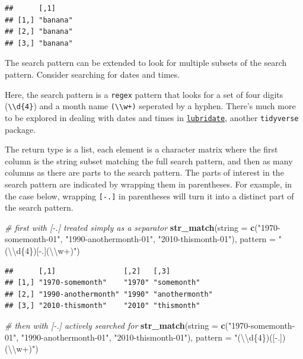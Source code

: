 \documentclass[]{book}
\newenvironment{Shaded}{}{}
\newcommand{\CharTok}[1]{\textcolor[rgb]{0.25,0.44,0.63}{#1}}
\newcommand{\CommentTok}[1]{\textcolor[rgb]{0.38,0.63,0.69}{\textit{#1}}}
\newcommand{\DataTypeTok}[1]{\textcolor[rgb]{0.56,0.13,0.00}{#1}}
\newcommand{\KeywordTok}[1]{\textcolor[rgb]{0.00,0.44,0.13}{\textbf{#1}}}
\newcommand{\NormalTok}[1]{#1}
\newcommand{\StringTok}[1]{\textcolor[rgb]{0.25,0.44,0.63}{#1}}
\begin{document}
\begin{verbatim}
##      [,1]    
## [1,] "banana"
## [2,] "banana"
## [3,] "banana"
\end{verbatim}

The search pattern can be extended to look for multiple subsets of the search pattern. Consider searching for dates and times.

Here, the search pattern is a \texttt{regex} pattern that looks for a set of four digits (\texttt{\textbackslash{}\textbackslash{}d\{4\}}) and a month name \texttt{(\textbackslash{}\textbackslash{}w+)} seperated by a hyphen. There's much more to be explored in dealing with dates and times in \href{https://lubridate.tidyverse.org/}{\texttt{lubridate}}, another \texttt{tidyverse} package.

The return type is a list, each element is a character matrix where the first column is the string subset matching the full search pattern, and then as many columns as there are parts to the search pattern. The parts of interest in the search pattern are indicated by wrapping them in parentheses. For example, in the case below, wrapping \texttt{{[}-.{]}} in parentheses will turn it into a distinct part of the search pattern.

\begin{Shaded}
\begin{Highlighting}[]
\CommentTok{# first with [-.] treated simply as a separator}
\KeywordTok{str_match}\NormalTok{(}\DataTypeTok{string =} \KeywordTok{c}\NormalTok{(}\StringTok{"1970-somemonth-01"}\NormalTok{,}
                     \StringTok{"1990-anothermonth-01"}\NormalTok{,}
                     \StringTok{"2010-thismonth-01"}\NormalTok{),}
          \DataTypeTok{pattern =} \StringTok{"(}\CharTok{\textbackslash{}\textbackslash{}}\StringTok{d\{4\})[-.](}\CharTok{\textbackslash{}\textbackslash{}}\StringTok{w+)"}\NormalTok{)}
\end{Highlighting}
\end{Shaded}

\begin{verbatim}
##      [,1]                [,2]   [,3]          
## [1,] "1970-somemonth"    "1970" "somemonth"   
## [2,] "1990-anothermonth" "1990" "anothermonth"
## [3,] "2010-thismonth"    "2010" "thismonth"
\end{verbatim}

\begin{Shaded}
\begin{Highlighting}[]
\CommentTok{# then with [-.] actively searched for}
\KeywordTok{str_match}\NormalTok{(}\DataTypeTok{string =} \KeywordTok{c}\NormalTok{(}\StringTok{"1970-somemonth-01"}\NormalTok{,}
                     \StringTok{"1990-anothermonth-01"}\NormalTok{,}
                     \StringTok{"2010-thismonth-01"}\NormalTok{),}
          \DataTypeTok{pattern =} \StringTok{"(}\CharTok{\textbackslash{}\textbackslash{}}\StringTok{d\{4\})([-.])(}\CharTok{\textbackslash{}\textbackslash{}}\StringTok{w+)"}\NormalTok{)}
\end{Highlighting}
\end{Shaded}
\end{document}
